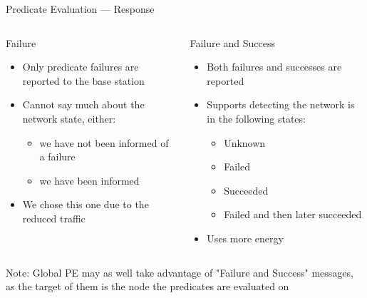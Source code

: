 \documentclass[usenames,dvipsnames]{beamer}
\begin{document}
\begin{frame}{Predicate Evaluation --- Response}
\begin{columns}[t]
	\begin{column}[T]{5cm}
		Failure
		\begin{itemize}
			\item Only predicate failures are reported to the base station
			\item Cannot say much about the network state, either:
				\begin{itemize}
					\item we have not been informed of a failure
					\item we have been informed
				\end{itemize}
			\item We chose this one due to the reduced traffic
		\end{itemize}
	\end{column}
	\begin{column}[T]{5cm}
		Failure and Success
		\begin{itemize}
			\item Both failures and successes are reported
			\item Supports detecting the network is in the following states:
				\begin{itemize}
					\item Unknown
					\item Failed
					\item Succeeded
					\item Failed and then later succeeded
				\end{itemize}
			\item Uses more energy
		\end{itemize}
	\end{column}
	\end{columns}
	\vspace{1em}

	Note: Global PE may as well take advantage of "Failure and Success" messages, as the target of them is the node the predicates are evaluated on
\end{frame}
\end{document}
